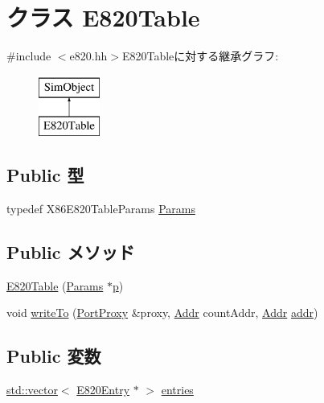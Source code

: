 \hypertarget{classX86ISA_1_1E820Table}{
\section{クラス E820Table}
\label{classX86ISA_1_1E820Table}
}


{\ttfamily \#include $<$e820.hh$>$}E820Tableに対する継承グラフ:\begin{figure}[H]
\begin{center}
\leavevmode
\includegraphics[height=2cm]{classX86ISA_1_1E820Table}
\end{center}
\end{figure}
\subsection*{Public 型}
\begin{DoxyCompactItemize}
\item 
typedef X86E820TableParams \hyperlink{classX86ISA_1_1E820Table_a84755d6f6a8627e71c15d80a4aa7c1a7}{Params}
\end{DoxyCompactItemize}
\subsection*{Public メソッド}
\begin{DoxyCompactItemize}
\item 
\hyperlink{classX86ISA_1_1E820Table_a235e45a6f37dbc3e1ac9c29a592a9f12}{E820Table} (\hyperlink{classX86ISA_1_1E820Table_a84755d6f6a8627e71c15d80a4aa7c1a7}{Params} $\ast$\hyperlink{namespaceX86ISA_af675c1d542a25b96e11164b80809a856}{p})
\item 
void \hyperlink{classX86ISA_1_1E820Table_a09670d948d4e9a8eb98e40b68b24b7b1}{writeTo} (\hyperlink{classPortProxy}{PortProxy} \&proxy, \hyperlink{base_2types_8hh_af1bb03d6a4ee096394a6749f0a169232}{Addr} countAddr, \hyperlink{base_2types_8hh_af1bb03d6a4ee096394a6749f0a169232}{Addr} \hyperlink{namespaceX86ISA_ab705917f60c5566f9ce56a93f798b2e2}{addr})
\end{DoxyCompactItemize}
\subsection*{Public 変数}
\begin{DoxyCompactItemize}
\item 
\hyperlink{classstd_1_1vector}{std::vector}$<$ \hyperlink{classX86ISA_1_1E820Entry}{E820Entry} $\ast$ $>$ \hyperlink{classX86ISA_1_1E820Table_a15964c933e068d7bfa598d6900a7ab4d}{entries}
\end{DoxyCompactItemize}


